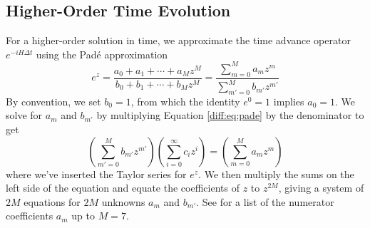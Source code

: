 \documentclass[11pt, a4paper]{article}
\begin{document}
\subsection{Higher-Order Time Evolution}\label{diff:ss:CN-time}
For a higher-order solution in time, we approximate the time advance operator $ e^{-iH\Delta t} $ using the Pad\'{e} approximation
\begin{equation}
	e^{z} = \frac{a_{0} + a_{1} + \cdots + a_{M}z^{M}}{b_{0} + b_{1} + \cdots + b_{M}z^{M}} = \frac{\sum_{m=0}^{M}a_{m}z^{m}}{\sum_{m'=0}^{M}b_{m'}z^{m'}} \label{diff:eq:pade}
\end{equation}
By convention, we set $ b_{0} = 1 $, from which the identity $ e^{0} = 1 $ implies $ a_{0} = 1 $. We solve for $ a_{m} $ and $ b_{m'} $ by multiplying Equation \ref{diff:eq:pade}  by the denominator to get
\begin{equation*}
	\left(\sum_{m'=0}^{M}b_{m'}z^{m'}\right)\left(\sum_{i=0}^{\infty}c_{i}z^{i}\right) = \left(\sum_{m=0}^{M}a_{m}z^{m}\right)
\end{equation*}
where we've inserted the Taylor series for $ e^{z} $. We then multiply the sums on the left side of the equation and equate the coefficients of $ z $ to $ z^{2M} $, giving a system of $ 2M $ equations for $ 2M $ unknowns $ a_{m} $ and $ b_{m'} $. See \cite{oes-exp} for a list of the numerator coefficients $ a_{m} $ up to $ M = 7 $. 

\iffalse
More generally (see \cite{exp-pade} for a thorough treatment beyond the scope fo this report), we can write the numerator $ P^{(M)}(z) $ in the form 
\begin{equation*}
	P^{(M)}(z) = \sum_{m = 0}^{M} \frac{(2M-m)!M!}{(2M)!(M-m)!m!}z^{m}
\end{equation*}
which implies the coefficients $ c_{m}^{(M)} $ read
\begin{equation*}
	c_{m}^{(M)} =  \frac{(2M-m)!M!}{(2M)!(M-m)!m!} = \frac{1}{m!} \frac{\prod_{k=0}^{m-1}(M-k)}{\prod_{l=0}^{m-1}(2M-k)}, \qquad m = 0, 1, 2, \ldots, M
\end{equation*}
This is most efficient to implement recursively via
\begin{equation*}
	c_{0} = 1, \qquad c_{m} = \frac{(M - m + 1)}{m(2M - m + 1)}c_{m-1}, \quad m = 1, 2, \ldots, M
\end{equation*}
\fi
\end{document}
